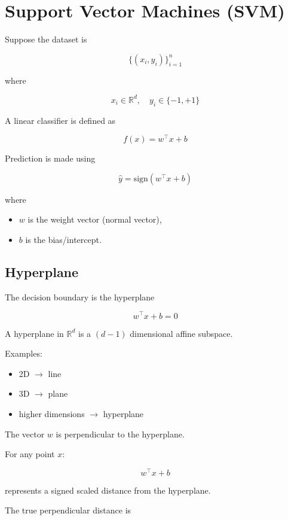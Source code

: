 \documentclass[10pt,a4paper]{article}
\begin{document}
		\section{Support Vector Machines (SVM)}
		
		Suppose the dataset is
		
		\[
		\{(x_i,y_i)\}_{i=1}^{n}
		\]
		
		where
		
		\[
		x_i \in \mathbb{R}^{d},
		\quad
		y_i \in \{-1,+1\}
		\]
		
		A linear classifier is defined as
		
		\[
		f(x)=w^\top x+b
		\]
		
		Prediction is made using
		
		\[
		\hat y = \mathrm{sign}(w^\top x+b)
		\]
		
		where
		
		\begin{itemize}
		    \item $w$ is the weight vector (normal vector),
		    \item $b$ is the bias/intercept.
		\end{itemize}
		
		\subsection{Hyperplane}
		
		The decision boundary is the hyperplane
		
		\[
		w^\top x+b=0
		\]
		
		A hyperplane in $\mathbb{R}^{d}$ is a $(d-1)$ dimensional affine subspace.
		
		Examples:
		
		\begin{itemize}
		    \item 2D $\rightarrow$ line
		    \item 3D $\rightarrow$ plane
		    \item higher dimensions $\rightarrow$ hyperplane
		\end{itemize}
		
		The vector $w$ is perpendicular to the hyperplane.
		
		For any point $x$:
		
		\[
		w^\top x+b
		\]
		
		represents a signed scaled distance from the hyperplane.
		
		The true perpendicular distance is
		
\end{document}
